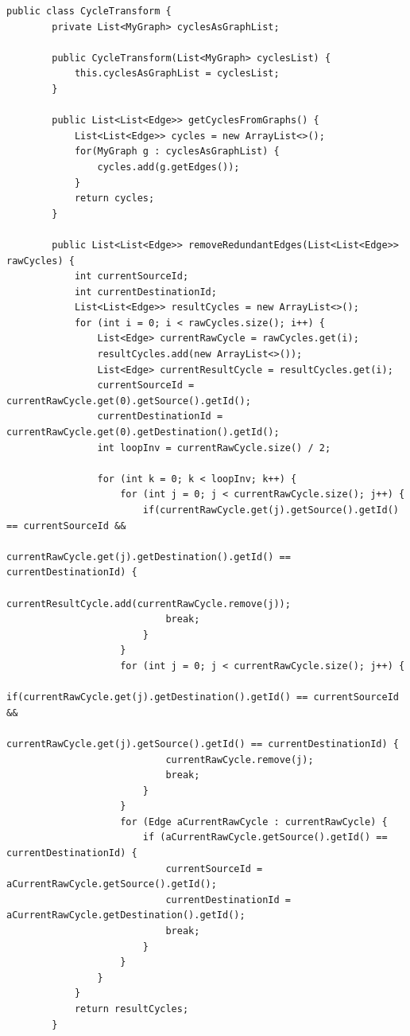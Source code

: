 \documentclass[12pt,a4paper]{article}
\begin{document}
\begin{Verbatim}[fontsize=\small]
    public class CycleTransform {
        private List<MyGraph> cyclesAsGraphList;

        public CycleTransform(List<MyGraph> cyclesList) {
            this.cyclesAsGraphList = cyclesList;
        }

        public List<List<Edge>> getCyclesFromGraphs() {
            List<List<Edge>> cycles = new ArrayList<>();
            for(MyGraph g : cyclesAsGraphList) {
                cycles.add(g.getEdges());
            }
            return cycles;
        }

        public List<List<Edge>> removeRedundantEdges(List<List<Edge>> rawCycles) {
            int currentSourceId;
            int currentDestinationId;
            List<List<Edge>> resultCycles = new ArrayList<>();
            for (int i = 0; i < rawCycles.size(); i++) {
                List<Edge> currentRawCycle = rawCycles.get(i);
                resultCycles.add(new ArrayList<>());
                List<Edge> currentResultCycle = resultCycles.get(i);
                currentSourceId = currentRawCycle.get(0).getSource().getId();
                currentDestinationId = currentRawCycle.get(0).getDestination().getId();
                int loopInv = currentRawCycle.size() / 2;

                for (int k = 0; k < loopInv; k++) {
                    for (int j = 0; j < currentRawCycle.size(); j++) {
                        if(currentRawCycle.get(j).getSource().getId() == currentSourceId &&
                                currentRawCycle.get(j).getDestination().getId() == currentDestinationId) {
                            currentResultCycle.add(currentRawCycle.remove(j));
                            break;
                        }
                    }
                    for (int j = 0; j < currentRawCycle.size(); j++) {
                        if(currentRawCycle.get(j).getDestination().getId() == currentSourceId &&
                                currentRawCycle.get(j).getSource().getId() == currentDestinationId) {
                            currentRawCycle.remove(j);
                            break;
                        }
                    }
                    for (Edge aCurrentRawCycle : currentRawCycle) {
                        if (aCurrentRawCycle.getSource().getId() == currentDestinationId) {
                            currentSourceId = aCurrentRawCycle.getSource().getId();
                            currentDestinationId = aCurrentRawCycle.getDestination().getId();
                            break;
                        }
                    }
                }
            }
            return resultCycles;
        }


\end{Verbatim}
\end{document}
